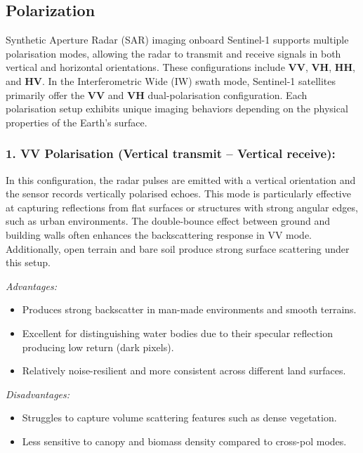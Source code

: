\subsection{Polarization}

Synthetic Aperture Radar (SAR) imaging onboard Sentinel-1 supports multiple polarisation modes, allowing the radar to transmit and receive signals in both vertical and horizontal orientations. These configurations include \textbf{VV}, \textbf{VH}, \textbf{HH}, and \textbf{HV}. In the Interferometric Wide (IW) swath mode, Sentinel-1 satellites primarily offer the \textbf{VV} and \textbf{VH} dual-polarisation configuration. Each polarisation setup exhibits unique imaging behaviors depending on the physical properties of the Earth's surface.

\subsubsection{\textbf{1. VV Polarisation (Vertical transmit – Vertical receive):}}

In this configuration, the radar pulses are emitted with a vertical orientation and the sensor records vertically polarised echoes. This mode is particularly effective at capturing reflections from flat surfaces or structures with strong angular edges, such as urban environments. The double-bounce effect between ground and building walls often enhances the backscattering response in VV mode. Additionally, open terrain and bare soil produce strong surface scattering under this setup.


\textit{Advantages:}
\begin{itemize}
    \item Produces strong backscatter in man-made environments and smooth terrains.
    \item Excellent for distinguishing water bodies due to their specular reflection producing low return (dark pixels).
    \item Relatively noise-resilient and more consistent across different land surfaces.
\end{itemize}

\textit{Disadvantages:}
\begin{itemize}
    \item Struggles to capture volume scattering features such as dense vegetation.
    \item Less sensitive to canopy and biomass density compared to cross-pol modes.
\end{itemize}

